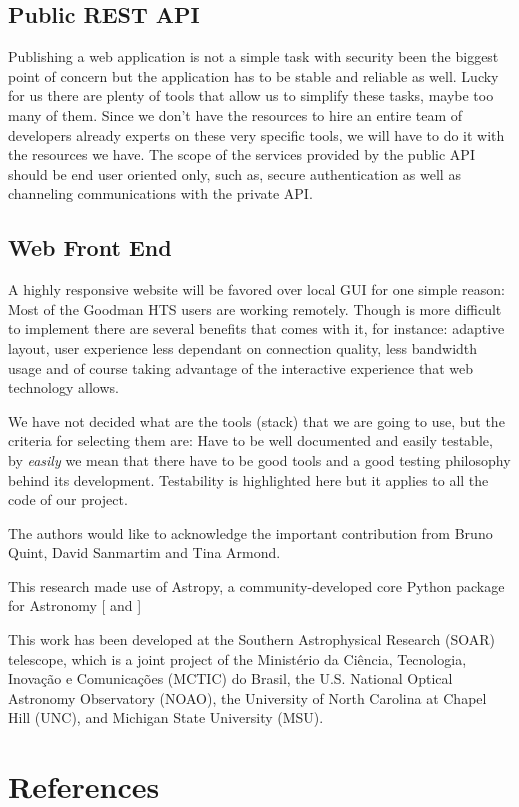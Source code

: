 \documentclass[11pt,twoside]{article}
\begin{document}
\subsection{Public REST API}
Publishing a web application is not a simple task with security been the biggest point of concern but the application has to be stable and reliable as well. Lucky for us there are plenty of tools that allow us to simplify these tasks, maybe too many of them. Since we don't have the resources to hire an entire team of developers already experts on these very specific tools, we will have to do it with the resources we have. The scope of the services provided by the public API should be end user oriented only, such as, secure authentication as well as channeling communications with the private API.

\subsection{Web Front End}
A highly responsive website will be favored over local GUI for one simple reason: Most of the Goodman HTS users are working remotely. Though is more difficult to implement there are several benefits that comes with it, for instance: adaptive layout, user experience less dependant on connection quality, less bandwidth usage and of course taking advantage of the interactive experience that web technology allows.

We have not decided what are the tools (stack) that we are going to use, but the criteria for selecting them are: Have to be well documented and easily testable, by \emph{easily} we mean that there have to be good tools and a good testing philosophy behind its development. Testability is highlighted here but it applies to all the code of our project.


\acknowledgements

The authors would like to acknowledge the important contribution from Bruno Quint, David Sanmartim and Tina Armond.

This research made use of Astropy, a community-developed core Python package for Astronomy [\citet{2013A&A...558A..33A} and \citet{2018AJ....156..123A}] 

This work has been developed at the Southern Astrophysical Research (SOAR) telescope, which is a joint project of the Minist\'erio da Ci\^encia, Tecnologia, Inova\c{c}\~ao e Comunica\c{c}\~oes (MCTIC) do Brasil, the U.S. National Optical Astronomy Observatory (NOAO), the University of North Carolina at Chapel Hill (UNC), and Michigan State University (MSU). 

\section{References}


\end{document}
